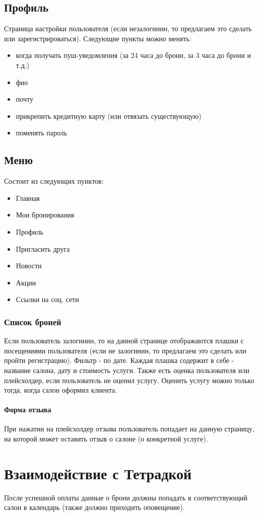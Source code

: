 \documentclass[DIV=calc, paper=a4, fontsize=11pt]{scrartcl} %
\begin{document}
\subsection{Профиль}
Страница настройки пользователя (если незалогинин, то предлагаем это сделать или зарегистрироваться). Следующие пункты можно менять:

\begin{itemize}
	\item когда получать пуш-уведомления (за 24 часа до брони, за 3 часа до брони и т.д.)
	\item фио
	\item почту
	\item прикрепить кредитную карту (или отвязать существующую)
	\item поменять пароль
\end{itemize}

\subsection{Меню}
Состоит из следующих пунктов:

\begin{itemize}
	\item Главная
	\item Мои бронирования
	\item Профиль
	\item Пригласить друга
	\item Новости
	\item Акции
	\item Ссылки на соц. сети
\end{itemize}

\subsubsection{Список броней}
Если пользователь залогинин, то на данной странице отображаются плашки с посещениями пользователя (если не залогинин, то предлагаем это сделать или пройти регистрацию). Фильтр - по дате.
Каждая плашка содержит в себе - название салона, дату и стоимость услуги. Также есть оценка пользователя или плейсхолдер, если пользователь не оценил услугу. Оценить услугу можно только тогда, когда салон оформил клиента.

\paragraph{Форма отзыва}
При нажатии на плейсхолдер отзыва пользователь попадает на данную страницу, на которой может оставить отзыв о салоне (о конкретной услуге).



\section{Взаимодействие с Тетрадкой}
После успешной оплаты данные о брони должны попадать в соответствующий салон в календарь (также должно приходить оповещение).
\end{document}
